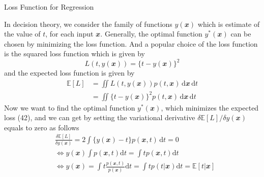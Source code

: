 \documentclass{bredelebeamer}
\begin{document}
\begin{frame}{Loss Function for Regression}
  \begin{justify}
    In decision theory, we consider the family of functions $y(\mathbfit{x})$ which
    is estimate of the value of $t$, for each input $\mathbfit{x}$. Generally, the
    optimal function $y^* (\mathbfit{x})$ can be chosen by minimizing the loss
    function. And a popular choice of the loss function is the squared loss
    function which is given by
    \begin{equation}
      L(t, y(\mathbfit{x})) = {\{t - y(\mathbfit{x})\}}^2
    \end{equation}
    and the expected loss function is given by
    \begin{equation}
      \begin{split}
        \mathbb{E}[L]
        &= \iint L(t, y(\mathbfit{x})) p(t,\mathbfit{x})\, \mathrm{d}\mathbfit{x}\, \mathrm{d}t \\
        &= \iint {\{t - y(\mathbfit{x})\}}^2 p(t,\mathbfit{x})\, \mathrm{d}\mathbfit{x}\, \mathrm{d}t
      \end{split}
    \end{equation}
    Now we want to find the optimal function $y^* (\mathbfit{x})$, which minimizes
    the expected loss (42), and we can get by setting the variational derivative
    $\delta \mathbb{E}[L] / \delta y(\mathbfit{x})$ equals to zero as follows
    \begin{equation}
      \begin{split}
        &\frac{\delta \mathbb{E}[L]}{\delta y(\mathbfit{x})}
        = 2 \int {\{ y(\mathbfit{x}) - t \}} p(\mathbfit{x}, t) \, \mathrm{d}t = 0 \\
        &\iff
          y(\mathbfit{x}) \int p(\mathbfit{x}, t) \mathrm{d}t
          = \int t p(\mathbfit{x},t) \mathrm{d}t
        \\
        &\iff
          y(\mathbfit{x})
          = \int t \frac{p(\mathbfit{x},t)}{p(\mathbfit{x})} \mathrm{d}t
          = \int t p(t | \mathbfit{x}) \mathrm{d}t
          = \mathbb{E}[t|\mathbfit{x}]
      \end{split}
    \end{equation}
  \end{justify}
\end{frame}
\end{document}
